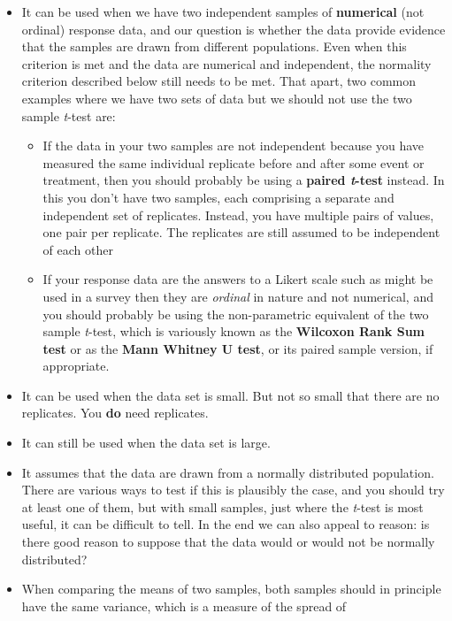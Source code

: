 \documentclass[
  letterpaper,
  DIV=11,
  numbers=noendperiod]{scrreprt}
\begin{document}
\begin{itemize}
\item
  It can be used when we have two independent samples of
  \textbf{numerical} (not ordinal) response data, and our question is
  whether the data provide evidence that the samples are drawn from
  different populations. Even when this criterion is met and the data
  are numerical and independent, the normality criterion described below
  still needs to be met. That apart, two common examples where we have
  two sets of data but we should not use the two sample \emph{t}-test
  are:

  \begin{itemize}
  \item
    If the data in your two samples are not independent because you have
    measured the same individual replicate before and after some event
    or treatment, then you should probably be using a \textbf{paired
    \emph{t}-test} instead. In this you don't have two samples, each
    comprising a separate and independent set of replicates. Instead,
    you have multiple pairs of values, one pair per replicate. The
    replicates are still assumed to be independent of each other
  \item
    If your response data are the answers to a Likert scale such as
    might be used in a survey then they are \emph{ordinal} in nature and
    not numerical, and you should probably be using the non-parametric
    equivalent of the two sample \emph{t}-test, which is variously known
    as the \textbf{Wilcoxon Rank Sum test} or as the \textbf{Mann
    Whitney U test}, or its paired sample version, if appropriate.
  \end{itemize}
\item
  It can be used when the data set is small. But not so small that there
  are no replicates. You \textbf{do} need replicates.
\item
  It can still be used when the data set is large.
\item
  It assumes that the data are drawn from a normally distributed
  population. There are various ways to test if this is plausibly the
  case, and you should try at least one of them, but with small samples,
  just where the \emph{t}-test is most useful, it can be difficult to
  tell. In the end we can also appeal to reason: is there good reason to
  suppose that the data would or would not be normally distributed?
\item
  When comparing the means of two samples, both samples should in
  principle have the same variance, which is a measure of the spread of

\end{itemize}
\end{document}
